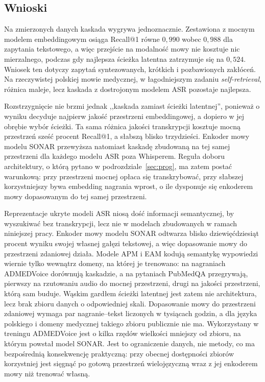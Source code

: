\subsection{Wnioski}
Na zmierzonych danych kaskada wygrywa jednoznacznie. Zestawiona z mocnym modelem embeddingowym
osiąga Recall@1 równe $0{,}990$ wobec $0{,}988$ dla zapytania tekstowego, a więc przejście na
modalność mowy nie kosztuje nic mierzalnego, podczas gdy najlepsza ścieżka latentna zatrzymuje się
na $0{,}524$. Wniosek ten dotyczy zapytań syntezowanych, krótkich i pozbawionych zakłóceń. Na
rzeczywistej polskiej mowie medycznej, w łagodniejszym zadaniu \textit{self-retrieval}, różnica
maleje, lecz kaskada z dostrojonym modelem ASR pozostaje najlepsza.

Rozstrzygnięcie nie brzmi jednak ,,kaskada zamiast ścieżki latentnej'', ponieważ o wyniku decyduje
najpierw jakość przestrzeni embeddingowej, a dopiero w jej obrębie wybór ścieżki. Ta sama różnica
jakości transkrypcji kosztuje mocną przestrzeń sześć procent Recall@1, a słabszą blisko
trzydzieści. Enkoder mowy modelu SONAR przewyższa natomiast kaskadę zbudowaną na tej samej
przestrzeni dla każdego modelu ASR poza Whisperem. Reguła doboru architektury, o którą pytano
w podrozdziale~\ref{sec:prog}, ma zatem postać warunkową: przy przestrzeni mocnej opłaca się
transkrybować, przy słabszej korzystniejszy bywa embedding nagrania wprost, o ile dysponuje się
enkoderem mowy dopasowanym do tej samej przestrzeni.

Reprezentacje ukryte modeli ASR niosą dość informacji semantycznej, by wyszukiwać bez
transkrypcji, lecz nie w modelach zbudowanych w ramach niniejszej pracy. Enkoder mowy modelu
SONAR odtwarza blisko dziewięćdziesiąt procent wyniku swojej własnej gałęzi tekstowej, a więc
dopasowanie mowy do przestrzeni zdaniowej działa. Modele APM i EAM kodują semantykę wypowiedzi
wiernie tylko wewnątrz domeny, na której je trenowano: na nagraniach ADMEDVoice dorównują
kaskadzie, a na pytaniach PubMedQA przegrywają, pierwszy na rzutowaniu audio do mocnej
przestrzeni, drugi na jakości przestrzeni, którą sam buduje. Wąskim gardłem ścieżki latentnej
jest zatem nie architektura, lecz brak zbioru danych o odpowiedniej skali. Dopasowanie mowy do
przestrzeni zdaniowej wymaga par nagranie--tekst liczonych w tysiącach godzin, a dla języka
polskiego i domeny medycznej takiego zbioru publicznie nie ma. Wykorzystany w treningu ADMEDVoice
\cite{ADMEDVoice} jest o kilka rzędów wielkości mniejszy od zbioru, na którym powstał model SONAR.
Jest to ograniczenie danych, nie metody, co ma bezpośrednią konsekwencję praktyczną: przy obecnej
dostępności zbiorów korzystniej jest sięgnąć po gotową przestrzeń wielojęzyczną wraz z jej
enkoderem mowy niż trenować własną.

